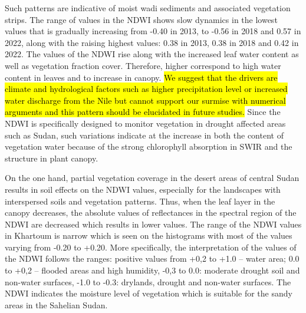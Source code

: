 \documentclass[jimaging,article,submit,pdftex,moreauthors]{Definitions/mdpi}
\begin{document}
Such patterns are indicative of moist wadi sediments and associated vegetation strips. The range of values in the NDWI shows slow dynamics in the lowest values that is gradually increasing from -0.40 in 2013, to -0.56 in 2018 and 0.57 in 2022, along with the raising highest values: 0.38 in 2013, 0.38 in 2018 and 0.42 in 2022. The values of the NDWI rise along with the increased leaf water content as well as vegetation fraction cover. Therefore, higher correspond to high water content in leaves and to increase in canopy. \hl{We suggest that the drivers are climate and hydrological factors such as higher precipitation level or increased water discharge from the Nile but cannot support our surmise with numerical arguments and this pattern should be elucidated in future studies. }Since the NDWI is specifically designed to monitor vegetation in drought affected areas such as Sudan, such variations indicate at the increase in both the content of vegetation water because of the strong chlorophyll absorption in SWIR and the structure in plant canopy. 

On the one hand, partial vegetation coverage in the desert areas of central Sudan results in soil effects on the NDWI values, especially for the landscapes with interspersed soils and vegetation patterns. Thus, when the leaf layer in the canopy decreases, the absolute values of reflectances in the spectral region of the NDWI are decreased which results in lower values. The range of the NDWI values in Khartoum is narrow which is seen on the histograms with most of the values varying from -0.20 to +0.20. More specifically, the interpretation of the values of the NDWI follows the ranges: positive values from +0,2 to +1.0 -- water area; 0.0 to +0,2 -- flooded areas and high humidity, -0,3 to 0.0: moderate drought soil and non-water surfaces, -1.0 to -0.3: drylands, drought and non-water surfaces. The NDWI indicates the moisture level of vegetation which is suitable for the sandy areas in the Sahelian Sudan.
\end{document}
